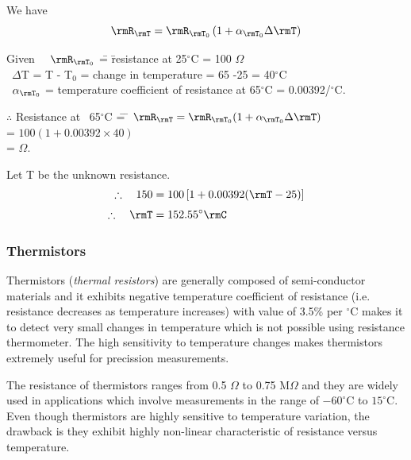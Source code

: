 \begin{solution}
We have
$$
\rmR_\rmT = \rmR_{\rmT_0} \left(1 + \alpha_{\rmT_0} \Delta \rmT\right)
$$
\begin{tabbing}
Given ~~$\rmR_{\rmT_0}$ \= = \= resistance at 25$^\circ$C = 100 $\Omega$\\[4pt]
\qquad \quad~$\Delta$T \>  = \> T - T$_0$ = change in temperature = 65 -25 = 40$^\circ$C\\[4pt]
\qquad \quad~$\alpha_{\rmT_0}$ \> = \> temperature coefficient of resistance at
65$^\circ$C  = 0.00392/$^\circ$C.
\end{tabbing}
\begin{tabbing}
$\therefore$ Resistance at ~65$^\circ$C \= = \= $\rmR_\rmT = \rmR_{\rmT_0}
(1+ \alpha_{\rmT_0} \Delta \rmT)$\\[3pt]
\> = \> $100 (1+0.00392 \times 40)$\\[3pt]
\> =  $\Omega$.
\end{tabbing}

Let T be the unknown resistance.
\begin{align*}
\therefore \quad 150 & = 100 \left[1+ 0.00392 (\rmT -25) \right]\\[3pt]
\therefore \quad \rmT & = 152.55^\circ \rmC
\end{align*}
\end{solution}

\subsubsection{Thermistors}\label{sec9.6.1.2}
Thermistors (\textit{thermal resistors}) are generally composed of
semi-conductor materials and it exhibits negative temperature
coefficient of resistance (i.e. resistance decreases as temperature
increases) with value of 3.5\% per $^\circ$C makes it to detect very
small changes in temperature which is not possible using resistance
thermometer. The high sensitivity to temperature changes makes
thermistors extremely useful for precission measurements.

The resistance of thermistors ranges from 0.5 $\Omega$ to 0.75
M$\Omega$ and they are widely used in applications which involve
measurements in the range of $-60^\circ$C to $15^\circ$C. Even though
thermistors are highly sensitive to temperature variation, the
drawback is they exhibit highly non-linear characteristic of
resistance versus temperature. 

